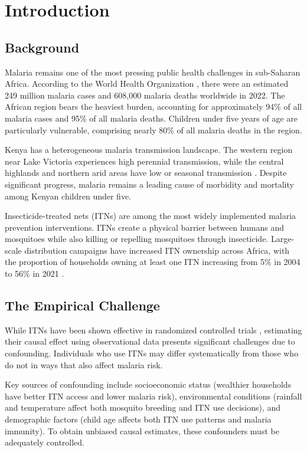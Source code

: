 \chapter{Introduction}

\section{Background}

Malaria remains one of the most pressing public health challenges in sub-Saharan Africa. According to the World Health Organization \citep{who2023malaria}, there were an estimated 249 million malaria cases and 608,000 malaria deaths worldwide in 2022. The African region bears the heaviest burden, accounting for approximately 94\% of all malaria cases and 95\% of all malaria deaths. Children under five years of age are particularly vulnerable, comprising nearly 80\% of all malaria deaths in the region.

Kenya has a heterogeneous malaria transmission landscape. The western region near Lake Victoria experiences high perennial transmission, while the central highlands and northern arid areas have low or seasonal transmission \citep{noor2014risk}. Despite significant progress, malaria remains a leading cause of morbidity and mortality among Kenyan children under five.

Insecticide-treated nets (ITNs) are among the most widely implemented malaria prevention interventions. ITNs create a physical barrier between humans and mosquitoes while also killing or repelling mosquitoes through insecticide. Large-scale distribution campaigns have increased ITN ownership across Africa, with the proportion of households owning at least one ITN increasing from 5\% in 2004 to 56\% in 2021 \citep{who2023malaria}.

\section{The Empirical Challenge}

While ITNs have been shown effective in randomized controlled trials \citep{lengeler2004insecticide}, estimating their causal effect using observational data presents significant challenges due to confounding. Individuals who use ITNs may differ systematically from those who do not in ways that also affect malaria risk.

Key sources of confounding include socioeconomic status (wealthier households have better ITN access and lower malaria risk), environmental conditions (rainfall and temperature affect both mosquito breeding and ITN use decisions), and demographic factors (child age affects both ITN use patterns and malaria immunity). To obtain unbiased causal estimates, these confounders must be adequately controlled.

